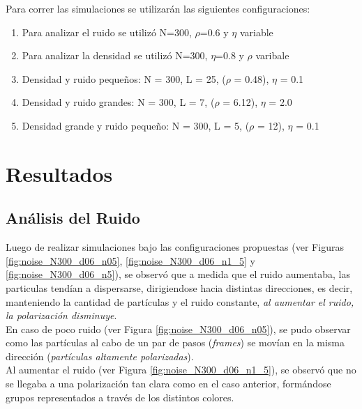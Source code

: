 \documentclass[12pt, a4paper]{report}
\begin{document}
Para correr las simulaciones se utilizarán las siguientes configuraciones: 
\begin{enumerate}
    \item Para analizar el ruido se utilizó N=300, $\rho$=0.6 y $\eta$ variable
    \item Para analizar la densidad se utilizó N=300, $\eta$=0.8 y $\rho$ varibale 
    \item Densidad y ruido pequeños:  N = 300, L = 25, ($\rho$ = 0.48), $\eta$ = 0.1
    \item Densidad y ruido grandes:  N = 300, L = 7, ($\rho$ = 6.12), $\eta$ = 2.0  
    \item Densidad grande y ruido pequeño: N = 300,	L = 5, ($\rho$ = 12), $\eta$ = 0.1
\end{enumerate}


\section{Resultados}


\subsection{Análisis del Ruido}

Luego de realizar simulaciones bajo las configuraciones propuestas (ver Figuras \ref{fig:noise_N300_d06_n05}, \ref{fig:noise_N300_d06_n1_5} y \ref{fig:noise_N300_d06_n5}), se observó que a medida que el ruido aumentaba, las particulas tendían a dispersarse, dirigiendose hacia distintas direcciones, es decir, manteniendo la cantidad de partículas y el ruido constante, \emph{al aumentar el ruido, la polarización disminuye}.\\

En caso de poco ruido (ver Figura \ref{fig:noise_N300_d06_n05}), se pudo observar como las partículas al cabo de un par de pasos (\emph{frames}) se movían en la misma dirección (\emph{partículas altamente polarizadas}).\\

Al aumentar el ruido (ver Figura \ref{fig:noise_N300_d06_n1_5}), se observó que no se llegaba a una polarización tan clara como en el caso anterior, formándose grupos representados a través de los distintos colores.\\
\end{document}
